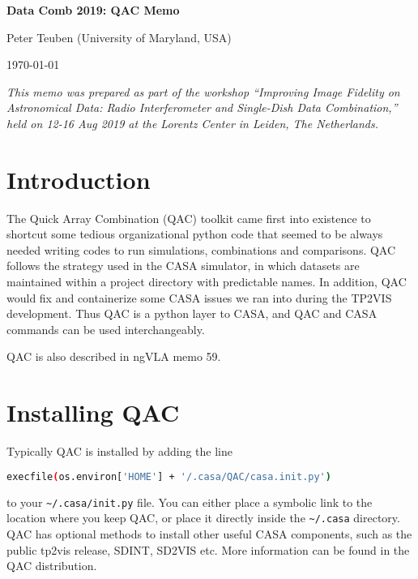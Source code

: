 \documentclass[12pt,a4paper]{article}
\begin{document}
\pagestyle{plain}
 

\begin{center}
{\Large{\bf{  Data Comb 2019: QAC Memo \\  }}} 

\end{center}
\bigskip

\centerline{Peter Teuben (University of Maryland, USA)}

\centerline{\today}
\bigskip

\noindent \textit{This memo was prepared as part of the workshop ``Improving Image Fidelity on Astronomical Data: Radio Interferometer and Single-Dish Data Combination,'' held on 12-16 Aug 2019 at the Lorentz Center in Leiden, The Netherlands.}

\section{Introduction}

The Quick Array Combination (QAC) toolkit came first into existence to
shortcut some tedious organizational python code that seemed to be
always needed writing codes to run simulations, combinations and
comparisons. QAC follows the strategy used in the CASA simulator, in
which datasets are maintained within a project directory with
predictable names.  In addition, QAC would fix and containerize some
CASA issues we ran into during the TP2VIS development. Thus QAC is a
python layer to CASA, and QAC and CASA commands can be used
interchangeably.

QAC is also described in ngVLA memo 59.



\section{Installing QAC}

Typically QAC is installed by adding the line
\begin{lstlisting}[language=bash]
    execfile(os.environ['HOME'] + '/.casa/QAC/casa.init.py')
\end{lstlisting}

to your \verb+~/.casa/init.py+ file. You can either place a symbolic
link to the location where you keep QAC, or place it directly inside
the \verb+~/.casa+ directory.  QAC has optional methods to install
other useful CASA components, such as the public tp2vis release,
SDINT, SD2VIS etc. More information can be found in the QAC
distribution.
\end{document}
